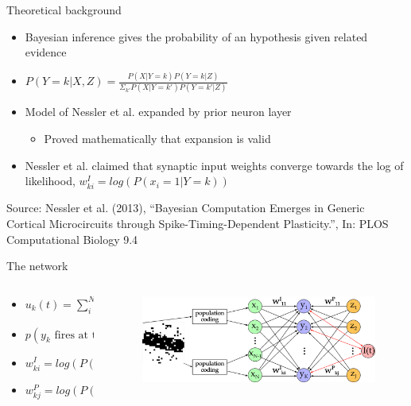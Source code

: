 \documentclass[aspectratio=169]{beamer}
\begin{document}
\begin{frame}{Theoretical background}
\vspace{-1.0cm}
      \begin{itemize}
        \item Bayesian inference gives the probability of an hypothesis given related evidence
        \item $P(Y = k|X, Z) = \frac{P(X|Y=k)P(Y = k|Z)}{\Sigma_{k'}P(X|Y=k')P(Y=k'|Z)}$
        \item Model of Nessler et al. expanded by prior neuron layer
          \begin{itemize}
            \item Proved mathematically that expansion is valid
          \end{itemize}
        \item Nessler et al. claimed that synaptic input weights converge towards the log of likelihood, $w^{I}_{ki} = log(P(x_i = 1 | Y = k))$
        \end{itemize}
   \scriptsize Source: Nessler et al. (2013), “Bayesian Computation Emerges in
 Generic Cortical Microcircuits through Spike-Timing-Dependent Plasticity.”, In: PLOS Computational Biology 9.4
\end{frame}

\begin{frame}{The network}
  \begin{columns}[onlytextwidth]
	\begin{column}{0.5\textwidth}
	  \begin{itemize}
	    \item $u_k(t) = \sum_{i=1}^N w^{I}_{ki} \cdot x_i(t) + \sum_{j=1}^J w^{P}_{kj} \cdot z_j(t)$
	    \item $p(y_k \text{ fires at time t}) \propto e^{u_k(t) - I(t)}$
	    \item $w^{I}_{ki} = log(P(x_i = 1 | Y = k))$
	    \item $w^{P}_{kj} = log(P(Y = k | Z = j))$
	  \end{itemize}
    \end{column}
    \begin{column}{0.5\textwidth}
        \begin{figure}
        \includegraphics[width=1\linewidth]{../Latex/figures/networkPlan.png}
      \end{figure} 
	\end{column}
  \end{columns}
\end{frame}
\end{document}

